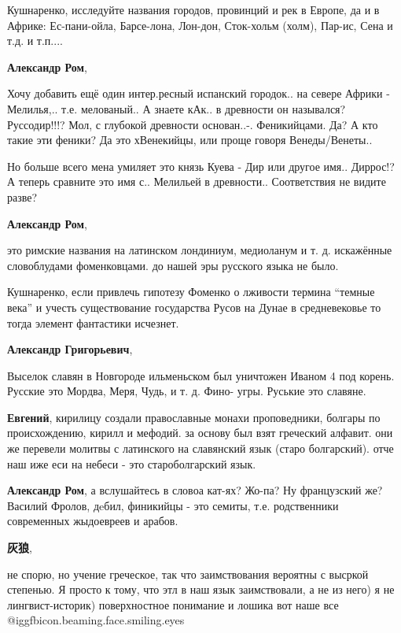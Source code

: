 \begin{itemize}
\begin{itemize}

Кушнаренко, исследуйте названия городов, провинций и рек в Европе, да и в
Африке: Ес-пани-ойла, Барсе-лона, Лон-дон, Сток-хольм (холм), Пар-ис, Сена и
т.д. и т.п....

\textbf{Александр Ром},

Хочу добавить ещё один интер.ресный испанский городок.. на севере Африки -
Мелилья,.. т.е. мелованый.. А знаете кАк.. в древности он назывался?
Руссодир!!!? Мол, с глубокой древности основан..-. Феникийцами. Да? А кто
такие эти феники? Да это хВенекийцы, или проще говоря Венеды/Венеты..

Но больше всего мена умиляет это князь Куева - Дир или другое имя.. Диррос!? А
теперь сравните это имя с.. Мелильей в древности.. Соответствия не видите
разве?

\textbf{Александр Ром}, 

это римские названия на латинском лондиниум, медиоланум и т. д. искажённые
словоблудами фоменковцами. до нашей эры русского языка не было.


Кушнаренко, если привлечь гипотезу Фоменко о лживости термина \enquote{темные века} и
учесть существование государства Русов на Дунае в средневековье то тогда
элемент фантастики исчезнет.

\textbf{Александр Григорьевич}, 

Выселок славян в Новгороде ильменьском был уничтожен Иваном 4 под корень.
Русские это Мордва, Меря, Чудь, и т. д. Фино- угры. Руськие это славяне.

\textbf{Евгений}, кирилицу создали православные монахи проповедники, болгары по
происхождению, кирилл и мефодий. за основу был взят греческий алфавит. они же
перевели молитвы с латинского на славянский язык (старо болгарский). отче наш
иже еси на небеси - это староболгарский язык.

\textbf{Александр Ром}, а вслушайтесь в словоа кат-ях? Жо-па? Ну французский же?
Василий Фролов, дeбил, финикийцы - это семиты, т.е. родственники современных жыдоевреев и арабов.

\textbf{灰狼}, 

не спорю, но учение греческое, так что заимствования вероятны с высркой
степенью. Я просто к тому, что этл в наш язык заимствовали, а не из него) я не
лингвист-историк) поверхностное понимание и лошика вот наше все @igg{fbicon.beaming.face.smiling.eyes} 


\end{itemize}
\end{itemize}
